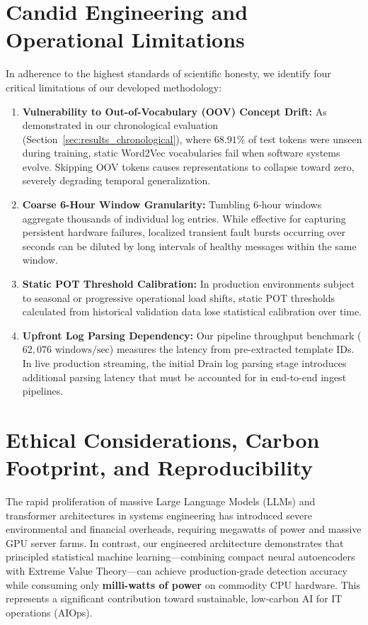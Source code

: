 \section{Candid Engineering and Operational Limitations}
\label{sec:conclusion_limitations}
In adherence to the highest standards of scientific honesty, we identify four critical limitations of our developed methodology:
\begin{enumerate}
    \item \textbf{Vulnerability to Out-of-Vocabulary (OOV) Concept Drift:} As demonstrated in our chronological evaluation (Section~\ref{sec:results_chronological}), where $68.91\%$ of test tokens were unseen during training, static Word2Vec vocabularies fail when software systems evolve. Skipping OOV tokens causes representations to collapse toward zero, severely degrading temporal generalization.
    \item \textbf{Coarse 6-Hour Window Granularity:} Tumbling 6-hour windows aggregate thousands of individual log entries. While effective for capturing persistent hardware failures, localized transient fault bursts occurring over seconds can be diluted by long intervals of healthy messages within the same window.
    \item \textbf{Static POT Threshold Calibration:} In production environments subject to seasonal or progressive operational load shifts, static POT thresholds calculated from historical validation data lose statistical calibration over time.
    \item \textbf{Upfront Log Parsing Dependency:} Our pipeline throughput benchmark ($62,076\text{ windows/sec}$) measures the latency from pre-extracted template IDs. In live production streaming, the initial Drain log parsing stage introduces additional parsing latency that must be accounted for in end-to-end ingest pipelines.
\end{enumerate}

\section{Ethical Considerations, Carbon Footprint, and Reproducibility}
\label{sec:conclusion_ethics}
The rapid proliferation of massive Large Language Models (LLMs) and transformer architectures in systems engineering has introduced severe environmental and financial overheads, requiring megawatts of power and massive GPU server farms. In contrast, our engineered architecture demonstrates that principled statistical machine learning—combining compact neural autoencoders with Extreme Value Theory—can achieve production-grade detection accuracy while consuming only \textbf{milli-watts of power} on commodity CPU hardware. This represents a significant contribution toward sustainable, low-carbon AI for IT operations (AIOps).

